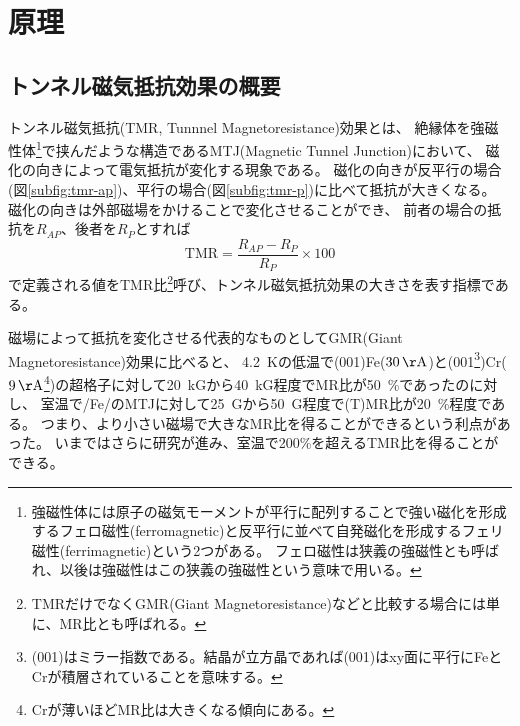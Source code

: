 \documentclass[../../../main]{subfiles}
\begin{document}
\section{原理}

\subsection{トンネル磁気抵抗効果の概要}
トンネル磁気抵抗(TMR, Tunnnel Magnetoresistance)効果とは、
絶縁体を強磁性体\footnote{
	強磁性体には原子の磁気モーメントが平行に配列することで強い磁化を形成するフェロ磁性(ferromagnetic)と反平行に並べて自発磁化を形成するフェリ磁性(ferrimagnetic)という2つがある。
	フェロ磁性は狭義の強磁性とも呼ばれ、以後は強磁性はこの狭義の強磁性という意味で用いる。
}で挟んだような構造であるMTJ(Magnetic Tunnel Junction)において、
磁化の向きによって電気抵抗が変化する現象である。
磁化の向きが反平行の場合(図\ref{subfig:tmr-ap})、平行の場合(図\ref{subfig:tmr-p})に比べて抵抗が大きくなる。
磁化の向きは外部磁場をかけることで変化させることができ、
前者の場合の抵抗を$R_{AP}$、後者を$R_P$とすれば
\begin{equation}\label{eq:tmr-ratio}
	\text{TMR} = \frac{R_{AP} - R_P}{R_P} \times 100
\end{equation}
で定義される値をTMR比\footnote{
	TMRだけでなくGMR(Giant Magnetoresistance)などと比較する場合には単に、MR比とも呼ばれる。
}呼び、トンネル磁気抵抗効果の大きさを表す指標である。

磁場によって抵抗を変化させる代表的なものとしてGMR(Giant Magnetoresistance)効果に比べると、
\SI{4.2}{K}の低温で(001)Fe($\SI{30}{\AA}$)と(001\footnote{
	(001)はミラー指数である。結晶が立方晶であれば(001)はxy面に平行にFeとCrが積層されていることを意味する。
})Cr($\SI{9}{\AA}$\footnote{
	Crが薄いほどMR比は大きくなる傾向にある。
})の超格子に対して\SI{20}{kG}から\SI{40}{kG}程度でMR比が\SI{50}{\%}であった\cite{gmr}のに対し、
室温で/Fe/のMTJに対して\SI{25}{G}から\SI{50}{G}程度で(T)MR比が\SI{20}{\%}程度である\cite{tmr}。
つまり、より小さい磁場で大きなMR比を得ることができるという利点があった。
いまではさらに研究が進み、室温で200\%を超えるTMR比を得る\cite{tmr-aist}\cite{tmr-mgo}ことができる。

\end{document}

